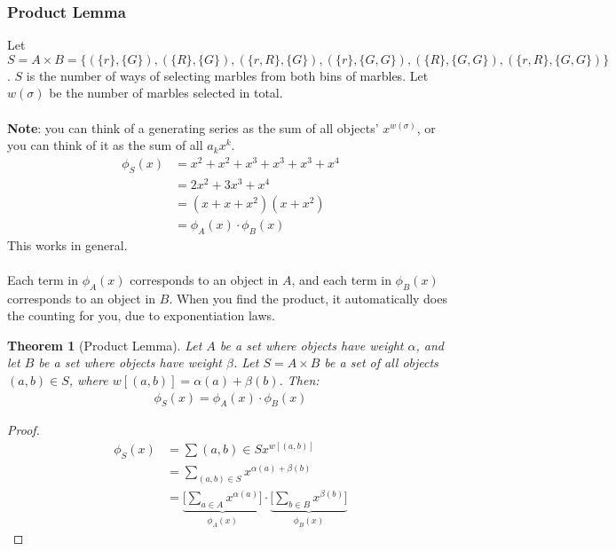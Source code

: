 \documentclass[]{article}
\newtheorem{theorem}{Theorem}[section]
\theoremstyle{definition}
\newcommand{\lecture}[1]{\marginpar{{\footnotesize $\leftarrow$ \underline{#1}}}}
\begin{document}
			\subsubsection{Product Lemma} \lecture{January 18, 2013}
				Let $S = A \times B = \{ (\{r\}, \{G\}), (\{R\}, \{G\}), (\{r, R\}, \{G\}), (\{r\}, \{G, G\}), (\{R\}, \{G, G\}), (\{r, R\}, \{G, G\}) \}$. $S$ is the number of ways of selecting marbles from both bins of marbles. Let $w(\sigma)$ be the number of marbles selected in total.
				\\ \\
				\textbf{Note}: you can think of a generating series as the sum of all objects' $x^{w(\sigma)}$, or you can think of it as the sum of all $a_k x^k$.
				\begin{align*}
					\phi_S(x) &= x^2 + x^2 + x^3 + x^3 + x^3 + x^4 \\
					&= 2x^2 + 3x^3 + x^4 \\
					&= (x + x + x^2)(x + x^2) \\
					&= \phi_A(x) \cdot \phi_B(x)
				\end{align*}
				This works in general.
				\\ \\
				Each term in $\phi_A(x)$ corresponds to an object in $A$, and each term in $\phi_B(x)$ corresponds to an object in $B$. When you find the product, it automatically does the counting for you, due to exponentiation laws.
				\begin{theorem}[Product Lemma]
					Let $A$ be a set where objects have weight $\alpha$, and let $B$ be a set where objects have weight $\beta$. Let $S = A \times B$ be a set of all objects $(a, b) \in S$, where $w[(a, b)] = \alpha(a) + \beta(b)$. Then:
					\begin{align*}
						\phi_S(x) = \phi_A(x) \cdot \phi_B(x)
					\end{align*}
				\end{theorem}

				\begin{proof}
					\begin{align*}
						\phi_S(x) &= \sum{(a, b) \in S} x^{w[(a, b)]} \\
						&= \sum_{(a, b) \in S} x^{\alpha(a) + \beta(b)} \\
						&= \underbrace{\bigg[ \sum_{a \in A} x^{\alpha(a)} \bigg]}_{\phi_A(x)} \cdot \underbrace{\bigg[ \sum_{b \in B} x^{\beta(b)} \bigg]}_{\phi_B(x)}
					\end{align*}
				\end{proof}
\end{document}
